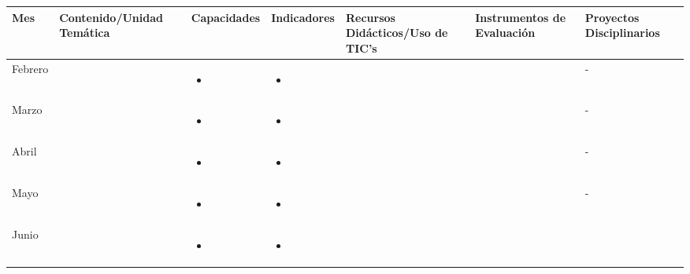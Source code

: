 \documentclass[landscape, a4paper, 10pt]{article}
\newcommand{\smallcellwidth}{0.7in}
\newcommand{\normalcellwidth}{1.2in}
\newcommand{\bigcellwidth}{2.0in}
\begin{document}
	\begin{longtable}{|m{\smallcellwidth}|p{\normalcellwidth}|p{\bigcellwidth}|p{\bigcellwidth}|p{\normalcellwidth}|p{\normalcellwidth}|p{\normalcellwidth}|}
		\hline
		\textbf{Mes} &
		\textbf{Contenido/Unidad Temática} &
		\textbf{Capacidades} &
		\textbf{Indicadores} &
		\textbf{Recursos Didácticos/Uso de TIC's} &
		\textbf{Instrumentos de Evaluación} &
		\textbf{Proyectos Disciplinarios} \\
		\hline
		\endhead
		Febrero &
		 &
		\begin{itemize}
			\item 
		\end{itemize} &
		\begin{itemize}
			\item 
		\end{itemize} &
		  &
		  &
		 - \\
		\hline
		Marzo &
		 &
		\begin{itemize}
			\item 
		\end{itemize} &
		\begin{itemize}
			\item 
		\end{itemize} &
		  &
		  &
		 - \\
		\hline
		Abril &
		 &
		\begin{itemize}
			\item 
		\end{itemize} &
		\begin{itemize}
			\item 
		\end{itemize} &
		  &
		  &
		 - \\
		\hline
		Mayo &
		 &
		\begin{itemize}
			\item 
		\end{itemize} &
		\begin{itemize}
			\item 
		\end{itemize} &
		  &
		  &
		 - \\
		\hline
		Junio &
		 &
		\begin{itemize}
			\item 
		\end{itemize} &
		\begin{itemize}
			\item 

\end{itemize}
\end{longtable}
\end{document}

